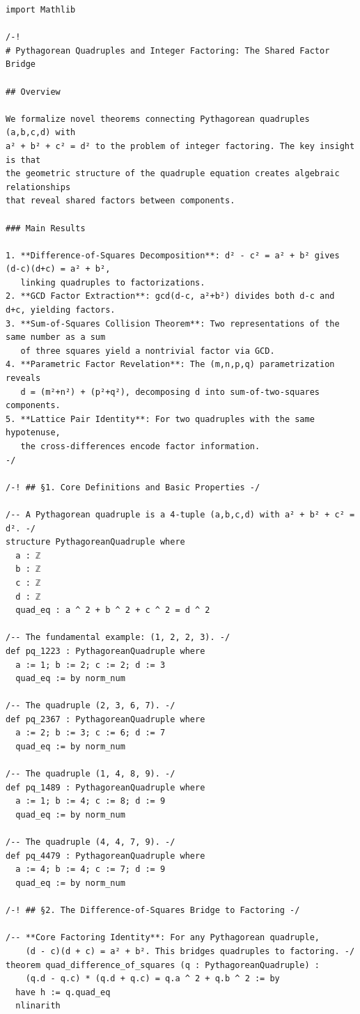 \documentclass[11pt,openany]{book}
\theoremstyle{definition}
\theoremstyle{plain}
\theoremstyle{remark}
\begin{document}
\begin{lstlisting}[style=lean]
import Mathlib

/-!
# Pythagorean Quadruples and Integer Factoring: The Shared Factor Bridge

## Overview

We formalize novel theorems connecting Pythagorean quadruples (a,b,c,d) with
a² + b² + c² = d² to the problem of integer factoring. The key insight is that
the geometric structure of the quadruple equation creates algebraic relationships
that reveal shared factors between components.

### Main Results

1. **Difference-of-Squares Decomposition**: d² - c² = a² + b² gives (d-c)(d+c) = a² + b²,
   linking quadruples to factorizations.
2. **GCD Factor Extraction**: gcd(d-c, a²+b²) divides both d-c and d+c, yielding factors.
3. **Sum-of-Squares Collision Theorem**: Two representations of the same number as a sum
   of three squares yield a nontrivial factor via GCD.
4. **Parametric Factor Revelation**: The (m,n,p,q) parametrization reveals
   d = (m²+n²) + (p²+q²), decomposing d into sum-of-two-squares components.
5. **Lattice Pair Identity**: For two quadruples with the same hypotenuse,
   the cross-differences encode factor information.
-/

/-! ## §1. Core Definitions and Basic Properties -/

/-- A Pythagorean quadruple is a 4-tuple (a,b,c,d) with a² + b² + c² = d². -/
structure PythagoreanQuadruple where
  a : ℤ
  b : ℤ
  c : ℤ
  d : ℤ
  quad_eq : a ^ 2 + b ^ 2 + c ^ 2 = d ^ 2

/-- The fundamental example: (1, 2, 2, 3). -/
def pq_1223 : PythagoreanQuadruple where
  a := 1; b := 2; c := 2; d := 3
  quad_eq := by norm_num

/-- The quadruple (2, 3, 6, 7). -/
def pq_2367 : PythagoreanQuadruple where
  a := 2; b := 3; c := 6; d := 7
  quad_eq := by norm_num

/-- The quadruple (1, 4, 8, 9). -/
def pq_1489 : PythagoreanQuadruple where
  a := 1; b := 4; c := 8; d := 9
  quad_eq := by norm_num

/-- The quadruple (4, 4, 7, 9). -/
def pq_4479 : PythagoreanQuadruple where
  a := 4; b := 4; c := 7; d := 9
  quad_eq := by norm_num

/-! ## §2. The Difference-of-Squares Bridge to Factoring -/

/-- **Core Factoring Identity**: For any Pythagorean quadruple,
    (d - c)(d + c) = a² + b². This bridges quadruples to factoring. -/
theorem quad_difference_of_squares (q : PythagoreanQuadruple) :
    (q.d - q.c) * (q.d + q.c) = q.a ^ 2 + q.b ^ 2 := by
  have h := q.quad_eq
  nlinarith


\end{lstlisting}
\end{document}
